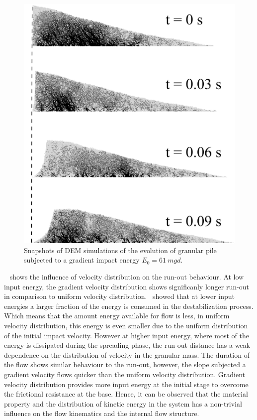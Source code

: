 \begin{figure}[tbph]
\centering
\includegraphics[width=\textwidth]{Uniform_Slope_DEM_200J}
\caption{Snapshots of DEM simulations of the evolution of granular pile 
subjected to a gradient impact energy $E_0 = 61 \ mgd$.}
\label{fig:Uniform_Slope_DEM_200J}
\end{figure}

~ shows the influence of velocity distribution on the 
run-out behaviour. At low input energy, the gradient velocity distribution 
shows significanly longer run-out in comparison to uniform velocity 
distribution.~ showed that at lower input energies a larger 
fraction of the energy is consumed in the destabilization process. Which means 
that the amount energy available for flow is less, in uniform velocity 
distribution, this energy is even smaller due to the uniform distribution of 
the initial impact velocity. However at higher input energy, where most of the 
energy is dissipated during the spreading phase, the run-out distance has a 
weak dependence on the distribution of velocity in the granular mass. The 
duration of the flow shows similar behaviour to the run-out, however, the slope 
subjected a gradient velocity flows quicker than the uniform velocity 
distribution. Gradient velocity distribution provides more input energy at the 
initial stage to overcome the frictional resistance at the base. Hence, it can 
be observed that the material property and the distribution of kinetic energy 
in the system has a non-trivial influence on the flow kinematics and the 
internal flow structure.


